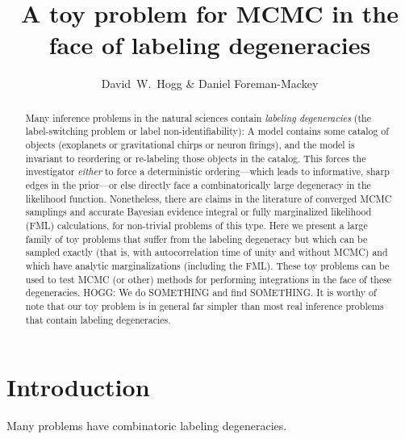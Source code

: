 \documentclass[12pt, preprint]{aastex}
\begin{document}
\title{A toy problem for MCMC in the face of labeling degeneracies}
\author{David~W.~Hogg \& Daniel Foreman-Mackey}

\begin{abstract}
Many inference problems in the natural sciences contain \emph{labeling
  degeneracies} (the label-switching problem or label
non-identifiability):
A model contains some catalog of objects (exoplanets or gravitational
chirps or neuron firings), and the model is invariant to reordering or
re-labeling those objects in the catalog.
This forces the investigator \emph{either} to force a deterministic
ordering---which leads to informative, sharp edges in the prior---or else
directly face a combinatorically large degeneracy in the likelihood
function.
Nonetheless, there are claims in the literature of converged MCMC
samplings and accurate Bayesian evidence integral or fully
marginalized likelihood (FML) calculations, for non-trivial problems
of this type.
Here we present a large family of toy problems that suffer from the
labeling degeneracy but which can be sampled exactly (that is, with
autocorrelation time of unity and without MCMC) and which have
analytic marginalizations (including the FML).
These toy problems can be used to test MCMC (or other) methods for
performing integrations in the face of these degeneracies.
HOGG: We do SOMETHING and find SOMETHING.
It is worthy of note that our toy problem is in general far simpler
than most real inference problems that contain labeling degeneracies.
\end{abstract}

\section{Introduction}

Many problems have combinatoric labeling degeneracies.
\end{document}
